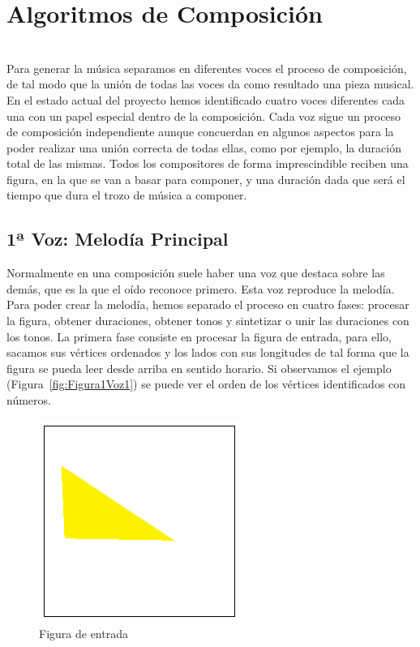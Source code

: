 \section{Algoritmos de Composición}
\label{sec:algComposicion}

\\

Para generar la música separamos en diferentes voces el proceso de composición, de tal modo que la unión de todas las voces da como resultado una pieza musical. En el estado actual del proyecto hemos identificado cuatro voces diferentes cada una con un papel especial dentro de la composición. Cada voz sigue un proceso de composición independiente aunque concuerdan en algunos aspectos para la poder realizar una unión correcta de todas ellas, como por ejemplo, la duración total de las mismas. Todos los compositores de forma imprescindible reciben una figura, en la que se van a basar para componer, y una duración dada que será el tiempo que dura el trozo de música a componer.

\subsection{1ª Voz: Melodía Principal}

Normalmente en una composición suele haber una voz que destaca sobre las demás, que es la que el oído reconoce primero. Esta voz reproduce la melodía. Para poder crear la melodía, hemos separado el proceso en cuatro fases: procesar la figura, obtener duraciones, obtener tonos y sintetizar o unir las duraciones con los tonos. 
La primera fase consiste en procesar la figura de entrada, para ello, sacamos sus vértices ordenados y los lados con sus longitudes de tal forma que la figura se pueda leer desde arriba en sentido horario. Si observamos el ejemplo (Figura~\ref{fig:Figura1Voz1}) se puede ver el orden de los vértices identificados con números.\\

		\begin{figure}[htbp]
		\centering
		\hspace*{0.0in}
		\includegraphics[scale=1.0]{graphics/simpletest1.png}
		\caption{Figura de entrada}
		\label{fig:Figura0Voz1}
		\end{figure}

